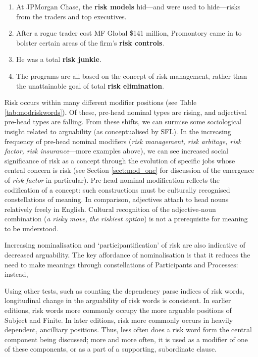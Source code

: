 \begin{enumerate}  [before=\color{black}\ttfamily] \setlength\itemsep{0em} \small
\item At JPMorgan Chase, the \textbf{risk models} hid---and were used to hide---risks from the traders and top executives.
\item After a rogue trader cost MF Global \$141 million, Promontory came in to bolster certain areas of the firm's \textbf{risk controls}.
\item He was a total \textbf{risk junkie}.
\item The programs are all based on the concept of risk management, rather than the unattainable goal of total \textbf{risk elimination}.
\end{enumerate}
%
Risk occurs within many different modifier positions (see Table \ref{tab:modriskwords}). Of these, pre-head nominal types are rising, and adjectival pre-head types are falling. From these shifts, we can surmise some sociological insight related to arguability (as conceptualised by SFL). In the increasing frequency of pre-head nominal modifiers (\emph{risk management, risk arbitage, risk factor, risk insurance}---more examples above), we can see increased social significance of risk as a concept through the evolution of specific jobs whose central concern is risk (see Section \ref{sect:mod_one} for discussion of the emergence of \emph{risk factor} in particular). Pre-head nominal modification reflects the codification of a concept: such constructions must be culturally recognised constellations of meaning. In comparison, adjectives attach to head nouns relatively freely in English. Cultural recognition of the adjective-noun combination (\emph{a risky move}, \emph{the riskiest option}) is not a prerequisite for meaning to be understood.

Increasing nominalisation and `participantification' of risk are also indicative of decreased arguability. The key affordance of nominalisation is that it reduces the need to make meanings through constellations of Participants and Processes: instead,

Using other tests, such as counting the dependency parse indices of risk words, longitudinal change in the arguability of risk words is consistent. In earlier editions, risk words more commonly occupy the more arguable positions of Subject and Finite. In later editions, risk more commonly occurs in heavily dependent, ancilliary positions. Thus, less often does a risk word form the central component being discussed; more and more often, it is used as a modifier of one of these components, or as a part of a supporting, subordinate clause.

